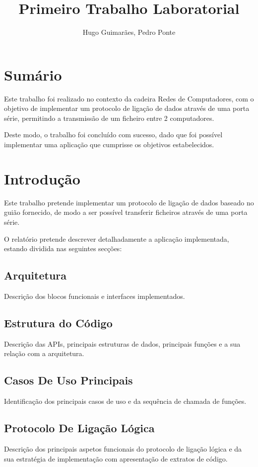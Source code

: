 \documentclass{article}
\author{Hugo Guimarães, Pedro Ponte}
\title{Primeiro Trabalho Laboratorial}
\begin{document}
\maketitle 

\pagebreak
\section{Sumário}

Este trabalho foi realizado no contexto da cadeira Redes de Computadores, com o objetivo de implementar um protocolo de  ligação de dados através de uma porta série, permitindo a transmissão de um ficheiro entre 2 computadores.
 
Deste modo, o trabalho foi concluído com sucesso, dado que foi possível implementar uma aplicação que cumprisse os objetivos estabelecidos.


\section{Introdução}

Este trabalho pretende implementar um protocolo de ligação de dados baseado no guião fornecido, de modo a ser possível transferir ficheiros através de uma porta série.

O relatório pretende descrever detalhadamente a aplicação implementada, estando dividida nas seguintes secções:

\subsection{Arquitetura}
Descrição dos blocos funcionais e interfaces implementados.


\subsection{Estrutura do Código}
Descrição das APIs, principais estruturas de dados, principais funções e a sua relação com a arquitetura.

\subsection{Casos De Uso Principais}
Identificação dos principais casos de uso e da sequência de chamada de funções.

\subsection{Protocolo De Ligação Lógica}
Descrição dos principais aspetos funcionais do protocolo de ligação lógica e da sua estratégia de implementação com apresentação de extratos de código.
\end{document}
